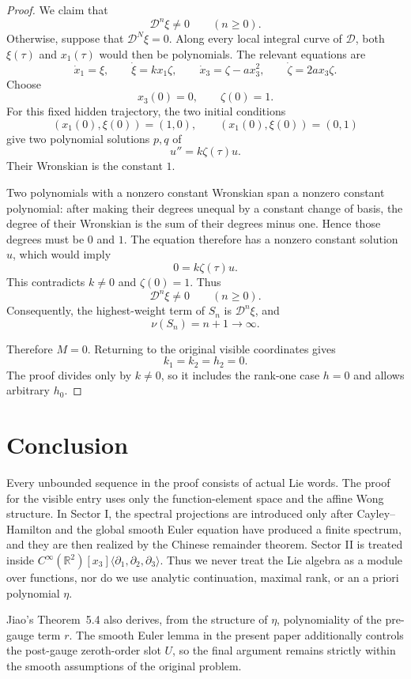 \documentclass[11pt,a4paper]{article}
\numberwithin{equation}{section}
\theoremstyle{journalplain}
\theoremstyle{journaldef}
\newcommand{\R}{\mathbb R}
\newcommand{\pd}{\partial}
\begin{document}
\begin{proof}
We claim that
\[
\mathcal D^n\xi\ne0
\qquad(n\ge0).
\]
Otherwise, suppose that \(\mathcal D^N\xi=0\). Along every local integral
curve of \(\mathcal D\), both \(\xi(\tau)\) and \(x_1(\tau)\) would then
be polynomials. The relevant equations are
\[
\dot x_1=\xi,\qquad
\dot\xi=kx_1\zeta,\qquad
\dot x_3=\zeta-ax_3^2,\qquad
\dot\zeta=2ax_3\zeta.
\]
Choose
\[
x_3(0)=0,\qquad \zeta(0)=1.
\]
For this fixed hidden trajectory, the two initial conditions
\[
(x_1(0),\xi(0))=(1,0),
\qquad
(x_1(0),\xi(0))=(0,1)
\]
give two polynomial solutions \(p,q\) of
\[
u''=k\zeta(\tau)u.
\]
Their Wronskian is the constant \(1\).

Two polynomials with a nonzero constant Wronskian span a nonzero constant
polynomial: after making their degrees unequal by a constant change of
basis, the degree of their Wronskian is the sum of their degrees minus
one. Hence those degrees must be \(0\) and \(1\). The equation therefore
has a nonzero constant solution \(u\), which would imply
\[
0=k\zeta(\tau)u.
\]
This contradicts \(k\ne0\) and \(\zeta(0)=1\). Thus
\[
\mathcal D^n\xi\ne0
\qquad(n\ge0).
\]
Consequently, the highest-weight term of \(S_n\) is
\(\mathcal D^n\xi\), and
\[
\nu(S_n)=n+1\longrightarrow\infty.
\]


Therefore \(M=0\). Returning to the original visible coordinates gives
\[
k_1=k_2=h_2=0.
\]
The proof divides only by \(k\ne0\), so it includes the rank-one case
\(h=0\) and allows arbitrary \(h_0\).
\end{proof}


\section{Conclusion}

Every unbounded sequence in the proof consists of actual Lie words.  The
proof for the visible entry uses only the function-element space and the
affine Wong structure.  In Sector I, the spectral projections are introduced
only after Cayley--Hamilton and the global smooth Euler equation have produced
a finite spectrum, and they are then realized by the Chinese remainder
theorem.  Sector II is treated inside
$C^\infty(\R^2)[x_3]\langle\pd_1,\pd_2,\pd_3\rangle$.  Thus we never treat
the Lie algebra as a module over functions, nor do we use analytic
continuation, maximal rank, or an a priori polynomial $\eta$.

Jiao's Theorem~5.4 also derives, from the structure of $\eta$, polynomiality
of the pre-gauge term $r$.  The smooth Euler lemma in the present paper
additionally controls the post-gauge zeroth-order slot $U$, so the final
argument remains strictly within the smooth assumptions of the original
problem.
\end{document}
